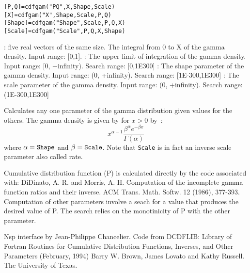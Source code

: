 \begin{mandesc}
\end{mandesc}
\label{cdfgam}
\begin{calling_sequence}
\begin{verbatim}
[P,Q]=cdfgam("PQ",X,Shape,Scale)  
[X]=cdfgam("X",Shape,Scale,P,Q)  
[Shape]=cdfgam("Shape",Scale,P,Q,X)  
[Scale]=cdfgam("Scale",P,Q,X,Shape)  
\end{verbatim}
\end{calling_sequence}
\begin{parameters}
  \begin{varlist}
     : five real vectors of the same size.
     The integral from 0 to X of the gamma density. Input range: [0,1].
     :  The upper limit of integration of the gamma density. Input range: [0, +infinity). Search range: [0,1E300]
       :  The shape parameter of the gamma density. Input range: (0, +infinity). Search range: [1E-300,1E300]
       :  The scale parameter of the gamma density. Input range: (0, +infinity). Search range: (1E-300,1E300]
  \end{varlist}
\end{parameters}
\begin{mandescription}
  Calculates any one parameter of the gamma distribution given values for the others.
  The gamma density is given by for $x>0$ by~:
  \begin{equation}
    x^{\alpha-1} \frac{ \beta^\alpha  e^{- \beta x}}{\Gamma(\alpha)}
  \end{equation}
  where $\alpha = \mbox{\tt Shape}$ and $\beta = \mbox{\tt Scale}$. 
  Note that \verb!Scale! is in fact an inverse scale parameter also 
  called rate. 

  Cumulative distribution function (P) is calculated directly by
  the code associated with: DiDinato, A. R. and Morris, A. H. 
  Computation of the  incomplete
  gamma function  ratios  and their  inverse.   ACM  Trans.  Math.
  Softw. 12 (1986), 377-393.
  Computation of other parameters involve a seach for a value that
  produces  the desired  value  of P.   The search relies  on  the
  monotinicity of P with the other parameter.
\end{mandescription}

\begin{program}
\end{program}

\begin{authors}
  Nsp interface by Jean-Philippe Chancelier. Code from DCDFLIB: 
  Library of Fortran Routines for Cumulative Distribution
  Functions, Inverses, and Other Parameters (February, 1994)
  Barry W. Brown, James Lovato and Kathy Russell. The University of Texas.
\end{authors}
